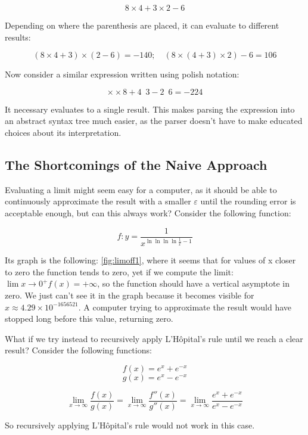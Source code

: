 \documentclass{article}
\theoremstyle{plain}
\theoremstyle{definition}
\theoremstyle{algorithm}
\begin{document}
	\[
	8 \times 4 + 3 \times  2 - 6
	\]
	
	Depending on where the parenthesis are placed, it can evaluate to different results:
	
	\[
	(8 \times 4 + 3) \times (2 - 6) = -140; \quad (8 \times (4 + 3) \times 2) - 6 = 106 
	\]
	
	Now consider a similar expression written using polish notation:
	
	\[
	\times \times 8 + 4 \enspace 3 - 2 \enspace 6 = -224
	\]
	
	It necessary evaluates to a single result.
	This makes parsing the expression into an abstract syntax tree \cite{wiki:abtree} much easier, as the parser doesn't have to make educated choices about its interpretation.
	
	\subsection{The Shortcomings of the Naive Approach}
	
	Evaluating a limit might seem easy for a computer, as it should be able to continuously approximate the result with a smaller $\varepsilon$ until the rounding error is acceptable enough, but can this always work?
	Consider the following function:
	
	\[
	f : y = \frac{1}{x^{\ln{\ln{\ln{\ln{\frac{1}{x}}}}}-1}} \tag{1} \label{eq:toinfinity}
	\]
	
	Its graph is the following: \cref{fig:limoff1}, where it seems that for values of x closer to zero the function tends to zero, yet if we compute the limit: \(\lim{x \to 0^{+}}{f(x) = +\infty}\), so the function should have a vertical asymptote in zero. We just can't see it in the graph because it becomes visible for \(x \approx 4.29 \times 10 ^{-1656521}\). A computer trying to approximate the result would have stopped long before this value, returning zero.
	
	What if we try instead to recursively apply L'Hôpital's rule \cite{wiki:hopital} until we reach a clear result?
	Consider the following functions:
	
	\[
	f(x) = e^{x} + e^{-x}
	\] 
	\[
	g(x) = e^{x} - e^{-x}
	\]
	
	\[
	\lim_{x \to \infty}{\frac{f(x)}{g(x)}} = \lim_{x \to \infty}{\frac{f''(x)}{g''(x)}} = \lim_{x \to \infty}{\frac{e^{x} + e^{-x}}{e^{x} - e^{-x}}}
	\]
	
	So recursively applying L'Hôpital's rule would not work in this case.
	
\end{document}
